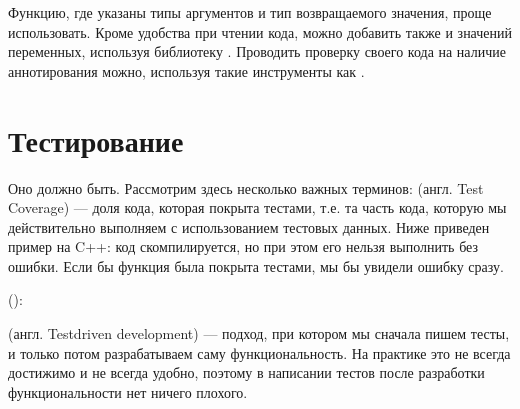 \documentclass[letterpaper,10pt,russian]{sphinxmanual}
\begin{document}
\sphinxAtStartPar
Функцию, где указаны типы аргументов и тип возвращаемого значения, проще использовать. Кроме удобства при чтении кода, можно добавить также и  значений переменных, используя библиотеку . Проводить проверку своего кода на наличие аннотирования можно, используя такие инструменты как .


\section{Тестирование}
\label{\detokenize{educational_materials/terms/content:id4}}
\sphinxAtStartPar
Оно должно быть. Рассмотрим здесь несколько важных терминов:  (англ. Test Coverage) — доля кода, которая покрыта тестами, т.е. та часть кода, которую мы действительно выполняем с использованием тестовых данных. Ниже приведен пример на C++: код скомпилируется, но при этом его нельзя выполнить без ошибки. Если бы функция  была покрыта тестами, мы бы увидели ошибку сразу.

\sphinxAtStartPar
():

\begin{sphinxVerbatim}[commandchars=\\\{\}]


\end{sphinxVerbatim}

\sphinxAtStartPar
{} (англ. Test\sphinxhyphen{}driven development) — подход, при котором мы сначала пишем тесты, и только потом разрабатываем саму функциональность. На практике это не всегда достижимо и не всегда удобно, поэтому в написании тестов после разработки функциональности нет ничего плохого.
\end{document}
